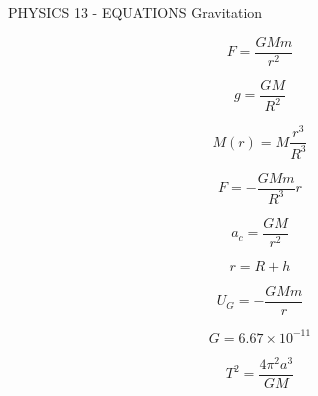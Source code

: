 PHYSICS 13 - EQUATIONS
Gravitation

$$F = \frac{GMm}{r^2}$$

$$g = \frac{GM}{R^2}$$

$$M(r) = M\frac{r^3}{R^3}$$

$$F = -\frac{GMm}{R^3} r$$

$$a_c = \frac{GM}{r^2}$$

$$r = R + h$$

$$U_G = -\frac{GMm}{r}$$


$$G=6.67\times10^{-11}$$

$$T^2=\frac{4\pi^2a^3}{GM}$$
